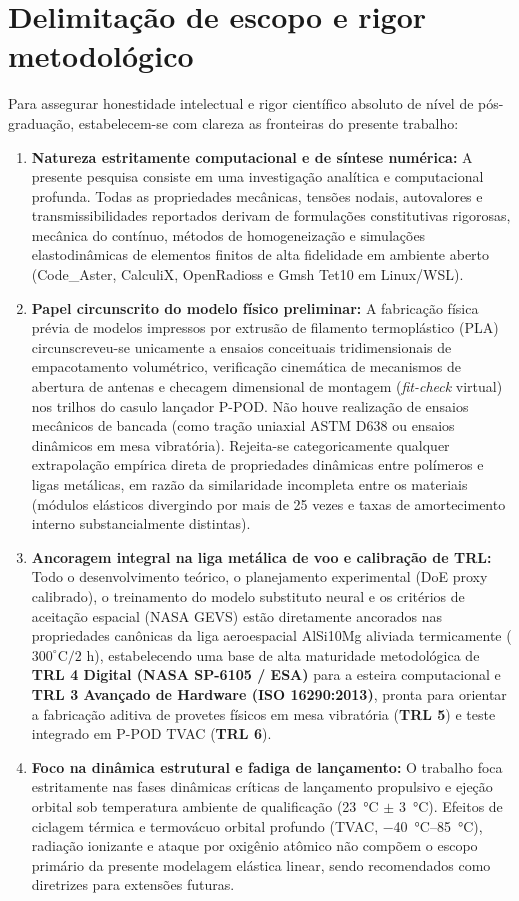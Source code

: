 \section{Delimitação de escopo e rigor metodológico}
\label{sec:intro-delimitacao}

Para assegurar honestidade intelectual e rigor científico absoluto de nível de pós-graduação, estabelecem-se com clareza as fronteiras do presente trabalho:
\begin{enumerate}
  \item \textbf{Natureza estritamente computacional e de síntese numérica:} A presente pesquisa consiste em uma investigação analítica e computacional profunda. Todas as propriedades mecânicas, tensões nodais, autovalores e transmissibilidades reportados derivam de formulações constitutivas rigorosas, mecânica do contínuo, métodos de homogeneização e simulações elastodinâmicas de elementos finitos de alta fidelidade em ambiente aberto (Code\_Aster, CalculiX, OpenRadioss e Gmsh Tet10 em Linux/WSL).
  \item \textbf{Papel circunscrito do modelo físico preliminar:} A fabricação física prévia de modelos impressos por extrusão de filamento termoplástico (PLA) circunscreveu-se unicamente a ensaios conceituais tridimensionais de empacotamento volumétrico, verificação cinemática de mecanismos de abertura de antenas e checagem dimensional de montagem (\textit{fit-check} virtual) nos trilhos do casulo lançador P-POD. Não houve realização de ensaios mecânicos de bancada (como tração uniaxial ASTM D638 ou ensaios dinâmicos em mesa vibratória). Rejeita-se categoricamente qualquer extrapolação empírica direta de propriedades dinâmicas entre polímeros e ligas metálicas, em razão da similaridade incompleta entre os materiais (módulos elásticos divergindo por mais de 25 vezes e taxas de amortecimento interno substancialmente distintas).
  \item \textbf{Ancoragem integral na liga metálica de voo e calibração de TRL:} Todo o desenvolvimento teórico, o planejamento experimental (DoE proxy calibrado), o treinamento do modelo substituto neural e os critérios de aceitação espacial (NASA GEVS) estão diretamente ancorados nas propriedades canônicas da liga aeroespacial AlSi10Mg aliviada termicamente ($300^\circ\text{C} / 2\text{ h}$), estabelecendo uma base de alta maturidade metodológica de \textbf{TRL 4 Digital (NASA SP-6105 / ESA)} para a esteira computacional e \textbf{TRL 3 Avançado de Hardware (ISO 16290:2013)}, pronta para orientar a fabricação aditiva de provetes físicos em mesa vibratória (\textbf{TRL 5}) e teste integrado em P-POD TVAC (\textbf{TRL 6}).
  \item \textbf{Foco na dinâmica estrutural e fadiga de lançamento:} O trabalho foca estritamente nas fases dinâmicas críticas de lançamento propulsivo e ejeção orbital sob temperatura ambiente de qualificação (\SI{23}{\celsius} $\pm$ \SI{3}{\celsius}). Efeitos de ciclagem térmica e termovácuo orbital profundo (TVAC, \SIrange{-40}{+85}{\celsius}), radiação ionizante e ataque por oxigênio atômico não compõem o escopo primário da presente modelagem elástica linear, sendo recomendados como diretrizes para extensões futuras.
\end{enumerate}

